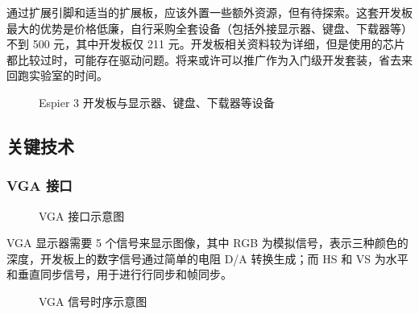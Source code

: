 \documentclass[hyperref,UTF8,12pt,a4paper]{ctexart}
\begin{document}
通过扩展引脚和适当的扩展板，应该外置一些额外资源，但有待探索。这套开发板最大的优势是价格低廉，自行采购全套设备（包括外接显示器、键盘、下载器等）不到
500 元，其中开发板仅 211
元。开发板相关资料较为详细，但是使用的芯片都比较过时，可能存在驱动问题。将来或许可以推广作为入门级开发套装，省去来回跑实验室的时间。

\begin{figure}[H]
\centering
{}
\caption{Espier 3 开发板与显示器、键盘、下载器等设备}
\end{figure}

\hypertarget{ux5173ux952eux6280ux672f}{%
\subsection{关键技术}\label{ux5173ux952eux6280ux672f}}

\hypertarget{vga-ux63a5ux53e3}{%
\subsubsection{VGA 接口}\label{vga-ux63a5ux53e3}}

\begin{figure}[H]
\centering
{}
\caption{VGA 接口示意图}
\end{figure}

VGA 显示器需要 5 个信号来显示图像，其中 RGB
为模拟信号，表示三种颜色的深度，开发板上的数字信号通过简单的电阻 D/A
转换生成；而 HS 和 VS 为水平和垂直同步信号，用于进行行同步和帧同步。

\begin{figure}[H]
\centering
{}
\caption{VGA 信号时序示意图}
\end{figure}
\end{document}
